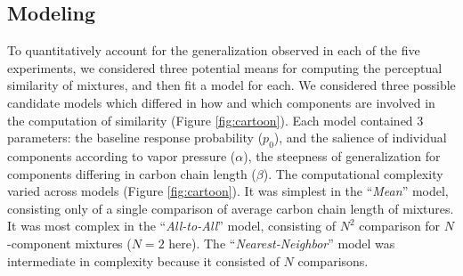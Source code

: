 \subsection*{Modeling}
\label{sec:results_modeling}
To quantitatively account for the generalization observed in each of the five experiments, we considered three potential means for computing the perceptual similarity of mixtures, and then fit a model for each.  
We considered three possible candidate models which differed in how and which components are involved in the computation of similarity (Figure \ref{fig:cartoon}).  
Each model contained 3 parameters: the baseline response probability ($p_0$), and the salience of individual components according to vapor pressure ($\alpha$), the steepness of generalization for components differing in carbon chain length ($\beta$).  
The computational complexity varied across models (Figure \ref{fig:cartoon}).  It was simplest in the ``\textit{Mean}'' model, consisting only of a single comparison of average carbon chain length of mixtures.  
It was most complex in the ``\textit{All-to-All}'' model, consisting of $N^2$ comparison for $N$-component mixtures ($N=2$ here).  The ``\textit{Nearest-Neighbor}'' model was intermediate in complexity because it consisted of $N$ comparisons.  